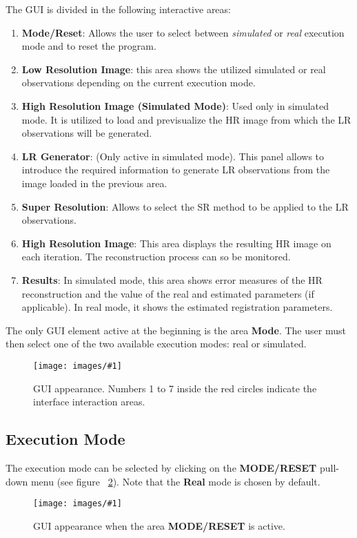 \documentclass[11pt,a4paper]{article}
\newcommand{\figureimage}[4]{%
\begin{figure}[t]%
\begin{center}%
\texttt{[image: images/\#1]}%
\caption{#4}%
\label{#3}%
\end{center}%
\end{figure}%
} %
\newcommand{\new}[1]{#1} %
\newcommand{\delete}[1]{} %
\newcommand{\change}[2]{\delete{#1}\new{#2}}
\begin{document}
The GUI is divided in the following interactive areas:
\begin{enumerate}
	\item \change{\textbf{Mode}}{\textbf{Mode/Reset}}: Allows the user to select between \textit{simulated} or \textit{real} execution mode \new{and to reset the program}.
	\item \textbf{Low Resolution Image}: this area shows the utilized simulated or real observations depending on the current execution mode.
	\item \textbf{High Resolution Image (Simulated Mode)}: Used only in simulated mode. It is utilized to load and previsualize the HR image from which the LR observations will be generated. 
	\item \textbf{LR Generator}: (Only active in simulated mode). This panel allows to introduce the required information to generate LR observations from the image loaded in the previous area. 
	\item \textbf{Super Resolution}: Allows to select the SR method to be applied to the LR observations. 
	\item \textbf{High Resolution Image}: This area displays the resulting HR image on each iteration. The reconstruction process can so be monitored.
	\item \textbf{Results}: In  simulated mode, this area shows error measures of the HR reconstruction and the value of the real and estimated parameters (if applicable). In real mode, it shows the estimated registration parameters. 		
\end{enumerate}
The only GUI element active at the beginning is the area \textbf{Mode}. The user must then select one of the two available execution modes: real or simulated.

\figureimage{p00}{width=1.0\textwidth}{fig:ap01p0}%
 {GUI appearance. Numbers 1 to 7 inside the red circles indicate the interface interaction areas.}

\subsection{Execution Mode}

The execution mode can be selected by clicking on the \change{\textbf{MODE}}{\textbf{MODE/RESET}}  pull-down menu (see figure ~\ref{fig:ap01p1}). Note that the \textbf{Real} mode is chosen by default.

\figureimage{p1}{width=1.0\textwidth}{fig:ap01p1}%
 {GUI appearance when the area \change{\textbf{Mode}}{\textbf{MODE/RESET}} is active.}
\end{document}
